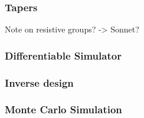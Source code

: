 \documentclass[]{article}
\begin{document}
\subsubsection{Tapers}

Note on resistive groups? -> Sonnet?

\subsubsection{Differentiable Simulator}

\subsubsection{Inverse design}

\subsubsection{Monte Carlo Simulation}








\newpage

% 
\begin{sloppypar}
\printbibliography
\end{sloppypar}
\end{document}
